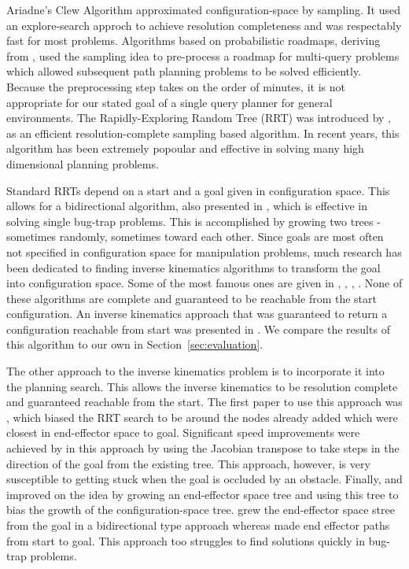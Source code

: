 \documentclass[conference]{IEEEtran}
\begin{document}
Ariadne's Clew Algorithm \cite{bessiere93} approximated configuration-space by sampling. It used an explore-search approch to achieve
resolution completeness and was respectably fast for most problems. Algorithms based on probabilistic roadmaps, deriving from
\cite{amato96}, used the sampling idea to pre-process a roadmap for multi-query problems which allowed subsequent path planning problems to
be solved efficiently. Because the preprocessing step takes on the order of minutes, it is not appropriate for our stated goal of a single
query planner for general environments. The Rapidly-Exploring Random Tree (RRT) was introduced by \cite{lavalle00}, \cite{lavalle98} as an
efficient resolution-complete sampling based algorithm. In recent years, this algorithm has been extremely popoular and effective in solving
many high dimensional planning problems.

Standard RRTs depend on a start and a goal given in configuration space. This allows for a bidirectional algorithm, also presented in
\cite{lavalle00}, which is effective in solving single bug-trap problems. This is accomplished by growing two trees - sometimes randomly,
sometimes toward each other. Since goals are most often not specified in configuration space for manipulation problems, much research has
been dedicated to finding inverse kinematics algorithms to transform the goal into configuration space. Some of the most famous ones are
given in \cite{goldenberg85}, \cite{guez88}, \cite{chang87}, \cite{parker89}. None of these algorithms are complete and guaranteed to be
reachable from the start configuration. An inverse kinematics approach that was guaranteed to return a configuration reachable from start
was presented in \cite{ahuactzin99}. We compare the results of this algorithm to our own in Section~\ref{sec:evaluation}. 

The other approach to the inverse kinematics problem is to incorporate it into the planning search. This allows the inverse kinematics to be
resolution complete and guaranteed reachable from the start. The first paper to use this approach was \cite{bertram06}, which biased the RRT
search to be around the nodes already added which were closest in end-effector space to goal. Significant speed improvements were achieved
by \cite{vande07} in this approach by using the Jacobian transpose to take steps in the direction of the goal from the existing tree. This
approach, however, is very susceptible to getting stuck when the goal is occluded by an obstacle. Finally, \cite{diankov08} and \cite{yao05}
improved on the idea by growing an end-effector space tree and using this tree to bias the growth of the configuration-space tree.
\cite{diankov08} grew the end-effector space stree from the goal in a bidirectional type approach whereas \cite{yao05} made end effector
paths from start to goal. This approach too struggles to find solutions quickly in bug-trap problems.
 
\end{document}
